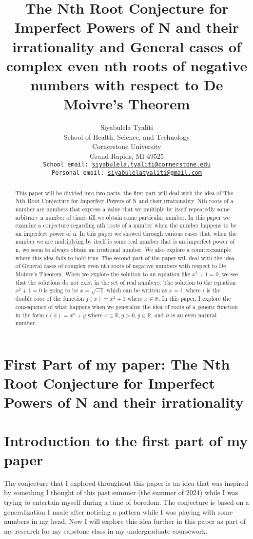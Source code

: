 \documentclass{article}
\title{The Nth Root Conjecture for Imperfect Powers of N and their irrationality and General cases of complex even nth roots of negative numbers with respect to De Moivre's Theorem}
\author{
 Siyabulela Tyaliti \\
  School of Health, Science, and Technology \\
  Cornerstone University \\
  Grand Rapids, MI 49525 \\
  \texttt{School email: \href{mailto:siyabulela.tyaliti@cornerstone.edu} {siyabulela.tyaliti@cornerstone.edu}} \\ 
  \texttt{Personal email: \href{mailto:siyabulelatyaliti@gmail.com}{siyabulelatyaliti@gmail.com}} \\ 
}
\begin{document}
\maketitle
\begin{abstract} 
This paper will be divided into two parts, the first part will deal with the idea of The Nth Root Conjecture for Imperfect Powers of N and their irrationality. Nth roots of a number are numbers that express a value that we multiply by itself repeatedly some arbitrary n number of times till we obtain some particular number. In this paper we examine a conjecture regarding nth roots of a number when the number happens to be an imperfect power of n. In this paper we showed through various cases that, when the number we are multiplying by itself is some real number that is an imperfect power of n, we seem to always obtain an irrational number. We also explore a counterexample where this idea fails to hold true.
The second part of the paper will deal with the idea of General cases of complex even nth roots of negative numbers with respect to De Moivre's Theorem. When we explore the solution to an equation like \(x^2+1=0\), we see that the solutions do not exist in the set of real numbers. The solution to the equation \(x^2 + 1 = 0\) is going to be \(x = \sqrt{-1}\) which can be written as \(x = i\), where \(i\) is the double root of the function \(f(x) = x^2 + 1\) where \(x \in \mathds{R}\). In this paper, I explore the consequence of what happens when we generalize the idea of roots of a generic function in the form \(c(x) = x^n + y\) where \(x \in \mathds{R}, y > 0, y \in \mathds{R}\), and \(n\) is an even natural number. 
\end{abstract}



\section*{First Part of my paper: The Nth Root Conjecture for Imperfect Powers of N and their irrationality} 

\section{Introduction to the first part of my paper}
The conjecture that I explored throughout this paper is an idea that was inspired by something I thought of this past summer (the summer of 2024) while I was trying to entertain myself during a time of boredom. The conjecture is based on a generalization I made after noticing a pattern while I was playing with some numbers in my head. Now I will explore this idea further in this paper as part of my research for my capstone class in my undergraduate coursework.  
\end{document}
